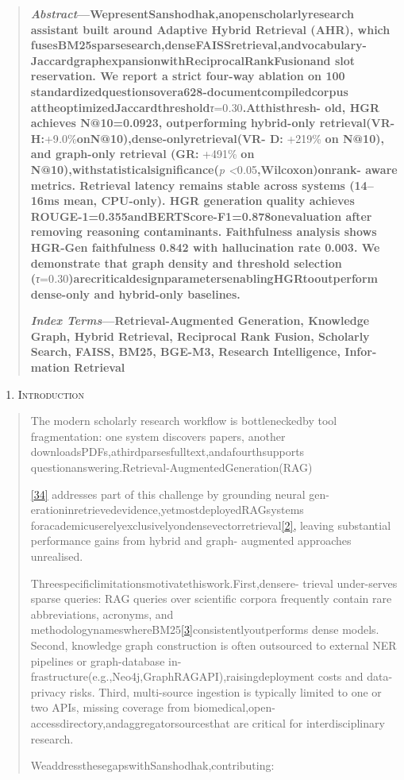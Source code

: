 \documentclass[
]{article}
\begin{document}
\begin{quote}
\textbf{\emph{Abstract}---WepresentSanshodhak,anopenscholarlyresearch assistant built around Adaptive Hybrid Retrieval (AHR), which fusesBM25sparsesearch,denseFAISSretrieval,andvocabulary- JaccardgraphexpansionwithReciprocalRankFusionand slot reservation. We report a strict four-way ablation on 100 standardizedquestionsovera628-documentcompiledcorpus attheoptimizedJaccardthreshold}\emph{τ}=0\emph{.}30\textbf{.Atthisthresh- old, HGR achieves N@10=0.0923, outperforming hybrid-only retrieval(VR-H:}+9\emph{.}0\%\textbf{onN@10),dense-onlyretrieval(VR- D:} +219\% \textbf{on N@10), and graph-only retrieval (GR:} +491\% \textbf{on N@10),withstatisticalsignificance(}\emph{p \textless{}}0\emph{.}05\textbf{,Wilcoxon)onrank- aware metrics. Retrieval latency remains stable across systems (14--16ms mean, CPU-only). HGR generation quality achieves ROUGE-1=0.355andBERTScore-F1=0.878onevaluation after removing reasoning contaminants. Faithfulness analysis shows HGR-Gen faithfulness 0.842 with hallucination rate 0.003. We demonstrate that graph density and threshold selection (}\emph{τ}=0\emph{.}30\textbf{)arecriticaldesignparametersenablingHGRtooutperform dense-only and hybrid-only baselines.}

\textbf{\emph{Index Terms}---Retrieval-Augmented Generation, Knowledge Graph, Hybrid Retrieval, Reciprocal Rank Fusion, Scholarly Search, FAISS, BM25, BGE-M3, Research Intelligence, Infor- mation Retrieval}
\end{quote}

\begin{enumerate}
\def\labelenumi{\Roman{enumi}.}
\item
  \textsc{Introduction}
\end{enumerate}

\begin{quote}
The modern scholarly research workflow is bottleneckedby tool fragmentation: one system discovers papers, another downloadsPDFs,athirdparsesfulltext,andafourthsupports questionanswering.Retrieval-AugmentedGeneration(RAG)

\hyperref[_bookmark42]{{[}34{]}} addresses part of this challenge by grounding neural gen- erationinretrievedevidence,yetmostdeployedRAGsystems foracademicuserelyexclusivelyondensevectorretrieval\hyperref[_bookmark22]{{[}2{]},} leaving substantial performance gains from hybrid and graph- augmented approaches unrealised.

Threespecificlimitationsmotivatethiswork.First,densere- trieval under-serves sparse queries: RAG queries over scientific corpora frequently contain rare abbreviations, acronyms, and methodologynameswhereBM25\hyperref[_bookmark23]{{[}3{]}}consistentlyoutperforms dense models. Second, knowledge graph construction is often outsourced to external NER pipelines or graph-database in- frastructure(e.g.,Neo4j,GraphRAGAPI),raisingdeployment costs and data-privacy risks. Third, multi-source ingestion is typically limited to one or two APIs, missing coverage from biomedical,open-accessdirectory,andaggregatorsourcesthat are critical for interdisciplinary research.

WeaddressthesegapswithSanshodhak,contributing:
\end{quote}
\end{document}
